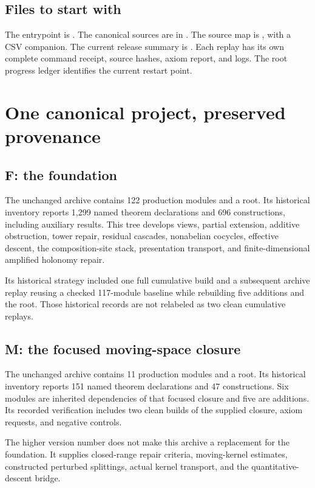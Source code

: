 \documentclass[11pt]{article}
\begin{document}
\subsection*{Files to start with}
The entrypoint is . The canonical sources are in . The source map is , with a CSV companion. The current release summary is . Each replay has its own complete command receipt, source hashes, axiom report, and logs. The root progress ledger identifies the current restart point.

\clearpage\section{One canonical project, preserved provenance}
\subsection{F: the foundation}
The unchanged archive  contains 122 production modules and a root. Its historical inventory reports 1,299 named theorem declarations and 696 constructions, including auxiliary results. This tree develops views, partial extension, additive obstruction, tower repair, residual cascades, nonabelian cocycles, effective descent, the composition-site stack, presentation transport, and finite-dimensional amplified holonomy repair.

Its historical strategy included one full cumulative build and a subsequent archive replay reusing a checked 117-module baseline while rebuilding five additions and the root. Those historical records are not relabeled as two clean cumulative replays.

\subsection{M: the focused moving-space closure}
The unchanged archive  contains 11 production modules and a root. Its historical inventory reports 151 named theorem declarations and 47 constructions. Six modules are inherited dependencies of that focused closure and five are additions. Its recorded verification includes two clean builds of the supplied closure, axiom requests, and negative controls.

The higher version number does not make this archive a replacement for the foundation. It supplies closed-range repair criteria, moving-kernel estimates, constructed perturbed splittings, actual kernel transport, and the quantitative-descent bridge.
\end{document}
